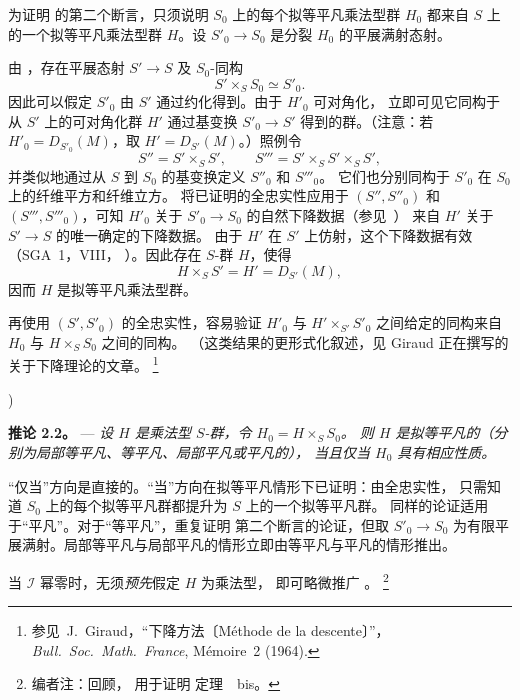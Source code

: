 为证明  的第二个断言，只须说明
\(S_0\) 上的每个拟等平凡乘法型群 \(H_0\) 都来自 \(S\) 上的一个拟等平凡乘法型群
\(H\)。设 \(S'_0\to S_0\) 是分裂 \(H_0\) 的平展满射态射。

由 ，存在平展态射 \(S'\to S\) 及 \(S_0\)-同构
\[
  S'\times_S S_0\simeq S'_0.
\]
因此可以假定 \(S'_0\) 由 \(S'\) 通过约化得到。由于 \(H'_0\) 可对角化，
立即可见它同构于从 \(S'\) 上的可对角化群 \(H'\) 通过基变换 \(S'_0\to S'\)
得到的群。（注意：若 \(H'_0=D_{S'_0}(M)\)，取 \(H'=D_{S'}(M)\)。）照例令
\[
  S''=S'\times_S S',
  \qquad
  S'''=S'\times_S S'\times_S S',
\]
并类似地通过从 \(S\) 到 \(S_0\) 的基变换定义 \(S''_0\) 和 \(S'''_0\)。
它们也分别同构于 \(S'_0\) 在 \(S_0\) 上的纤维平方和纤维立方。
将已证明的全忠实性应用于 \((S'',S''_0)\) 和 \((S''',S'''_0)\)，可知
\(H'_0\) 关于 \(S'_0\to S_0\) 的自然下降数据（参见\ ）
来自 \(H'\) 关于 \(S'\to S\) 的唯一确定的下降数据。
由于 \(H'\) 在 \(S'\) 上仿射，这个下降数据有效（SGA~1，VIII，
）。因此存在 \(S\)-群 \(H\)，使得
\[
  H\times_S S'=H'=D_{S'}(M),
\]
因而 \(H\) 是拟等平凡乘法型群。

再使用 \((S',S'_0)\) 的全忠实性，容易验证 \(H'_0\) 与 \(H'\times_{S'}S'_0\)
之间给定的同构来自 \(H_0\) 与 \(H\times_S S_0\) 之间的同构。
（这类结果的更形式化叙述，见 Giraud 正在撰写的关于下降理论的文章。%
\begingroup
\renewcommand{\thefootnote}{\(\ast\)}%
\footnote{参见\ J.~Giraud，“下降方法〔Méthode de la descente〕”， \emph{Bull.\
Soc.\ Math.\ France}, Mémoire~2 (1964).}%
\endgroup
\addtocounter{footnote}{-1})

\medskip
\noindent{}%
\textbf{推论 2.2。} ---
\textit{设 \(H\) 是乘法型 \(S\)-群，令 \(H_0=H\times_S S_0\)。
则 \(H\) 是拟等平凡的（分别为局部等平凡、等平凡、局部平凡或平凡的），
当且仅当 \(H_0\) 具有相应性质。}

“仅当”方向是直接的。“当”方向在拟等平凡情形下已证明：由全忠实性，
只需知道 \(S_0\) 上的每个拟等平凡群都提升为 \(S\) 上的一个拟等平凡群。
同样的论证适用于“平凡”。对于“等平凡”，重复证明
 第二个断言的论证，但取 \(S'_0\to S_0\)
为有限平展满射。局部等平凡与局部平凡的情形立即由等平凡与平凡的情形推出。

当 \(\mathscr I\) 幂零时，无须\emph{预先}假定 \(H\) 为乘法型，
即可略微推广 。
\footnote{编者注：回顾， 用于证明
定理~~bis。}

